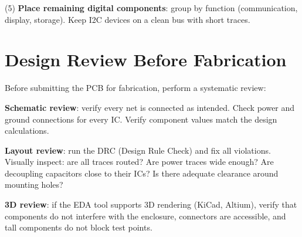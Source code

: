 \documentclass[11pt,letterpaper,twoside,openany]{book}
\begin{document}
(5) \textbf{Place remaining digital components}: group by function (communication, display, storage). Keep I2C devices on a clean bus with short traces.

\section{Design Review Before Fabrication}
Before submitting the PCB for fabrication, perform a systematic review:

\textbf{Schematic review}: verify every net is connected as intended. Check power and ground connections for every IC. Verify component values match the design calculations.

\textbf{Layout review}: run the DRC (Design Rule Check) and fix all violations. Visually inspect: are all traces routed? Are power traces wide enough? Are decoupling capacitors close to their ICs? Is there adequate clearance around mounting holes?

\textbf{3D review}: if the EDA tool supports 3D rendering (KiCad, Altium), verify that components do not interfere with the enclosure, connectors are accessible, and tall components do not block test points.
\end{document}
